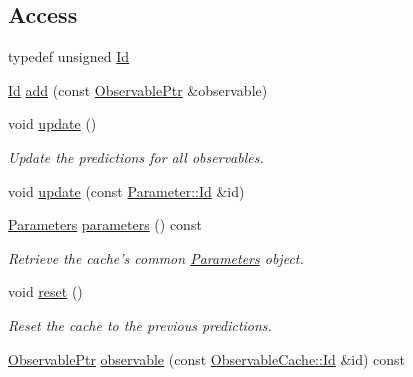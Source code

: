 \subsection*{Access}
\label{_amgrpbf733d8a933c1601697f364223fc7ecb}
 \begin{DoxyCompactItemize}
\item 
typedef unsigned \hyperlink{classeos_1_1ObservableCache_a393f1d7c8c2a58bc95845e12b615c6ee}{Id}
\item 
\hyperlink{classeos_1_1ObservableCache_a393f1d7c8c2a58bc95845e12b615c6ee}{Id} \hyperlink{classeos_1_1ObservableCache_a5994a8d42de0afabc01d401ef8bf27af}{add} (const \hyperlink{namespaceeos_a470e5dd806bd129080f1aa0c2954646f}{ObservablePtr} \&observable)
\item 
void \hyperlink{classeos_1_1ObservableCache_ae69a231f0546cabd80266f4c0fb8b49f}{update} ()
\begin{DoxyCompactList}\small\item\em Update the predictions for all observables. \item\end{DoxyCompactList}\item 
void \hyperlink{classeos_1_1ObservableCache_a934c9c731189f013eb69a79112b64a04}{update} (const \hyperlink{classeos_1_1Parameter_a065f55e66b2128cc5f14339e676d833a}{Parameter::Id} \&id)
\item 
\hyperlink{classeos_1_1Parameters}{Parameters} \hyperlink{classeos_1_1ObservableCache_ac4dafff6d4eb3b29157d5f326b880c85}{parameters} () const 
\begin{DoxyCompactList}\small\item\em Retrieve the cache's common \hyperlink{classeos_1_1Parameters}{Parameters} object. \item\end{DoxyCompactList}\item 
void \hyperlink{classeos_1_1ObservableCache_a4e1287495ae908ae08a1550a3c5fbdcc}{reset} ()
\begin{DoxyCompactList}\small\item\em Reset the cache to the previous predictions. \item\end{DoxyCompactList}\item 
\hyperlink{namespaceeos_a470e5dd806bd129080f1aa0c2954646f}{ObservablePtr} \hyperlink{classeos_1_1ObservableCache_a171e7c1c0e4e2741dc155e4b249bca6d}{observable} (const \hyperlink{classeos_1_1ObservableCache_a393f1d7c8c2a58bc95845e12b615c6ee}{ObservableCache::Id} \&id) const 
\item 

\end{DoxyCompactItemize}
